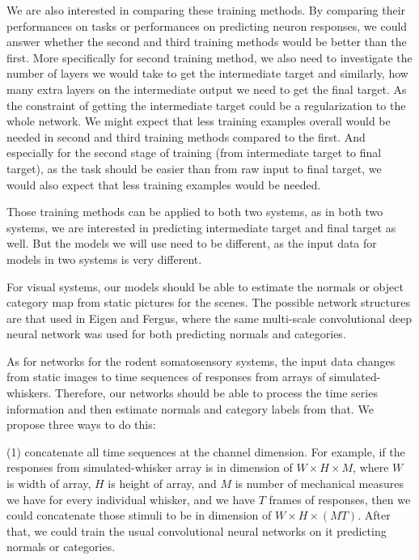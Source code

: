 \documentclass[12pt]{article}
\begin{document}
We are also interested in comparing these training methods. By comparing their performances on tasks or performances on predicting neuron responses, we could answer whether the second and third training methods would be better than the first. More specifically for second training method, we also need to investigate the number of layers we would take to get the intermediate target and similarly, how many extra layers on the intermediate output we need to get the final target. As the constraint of getting the intermediate target could be a regularization to the whole network. We might expect that less training examples overall would be needed in second and third training methods compared to the first. And especially for the second stage of training (from intermediate target to final target), as the task should be easier than from raw input to final target, we would also expect that less training examples would be needed.

Those training methods can be applied to both two systems, as in both two systems, we are interested in predicting intermediate target and final target as well. But the models we will use need to be different, as the input data for models in two systems is very different. 

For visual systems, our models should be able to estimate the normals or object category map from static pictures for the scenes. The possible network structures are that used in Eigen and Fergus\cite{Eigen2014}, where the same multi-scale convolutional deep neural network was used for both predicting normals and categories. 

As for networks for the rodent somatosensory systems, the input data changes from static images to time sequences of responses from arrays of simulated-whiskers. Therefore, our networks should be able to process the time series information and then estimate normals and category labels from that. We propose three ways to do this: 

(1) concatenate all time sequences at the channel dimension. For example, if the responses from simulated-whisker array is in dimension of $W\times H \times M$, where $W$ is width of array, $H$ is height of array, and $M$ is number of mechanical measures we have for every individual whisker, and we have $T$ frames of responses, then we could concatenate those stimuli to be in dimension of $W \times H \times (MT)$. After that, we could train the usual convolutional neural networks on it predicting normals or categories. 
\end{document}
